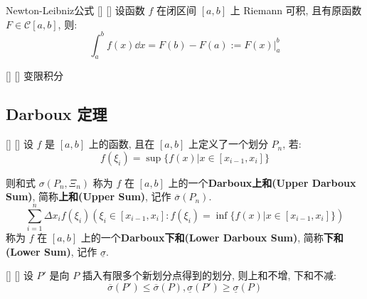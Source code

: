 \documentclass[UTF8]{ctexart}
\begin{document}
            \begin{thm}
			    []
			    {Newton-Leibniz公式}
			    []
			    []
                设函数 \(f\) 在闭区间 \([a,b]\) 上 Riemann 可积, 且有原函数 \(F\in\mathcal{C}[a,b]\), 则: 
                \[\int_a^b f(x)\dd x=F(b)-F(a):=F(x)\Big|_a^b\]
            \end{thm}

            \begin{dfn}
			    []
			    {}
			    []
			    []
                变限积分
            \end{dfn}
		
		\subsection{Darboux 定理}
			
			\begin{dfn}
			    []
			    {}
			    []
			    []
				设 \(f\) 是 \([a,b]\) 上的函数, 且在 \([a,b]\) 上定义了一个划分 \(P_n\), 若: 
				\[f(\xi_i)=\sup\{f(x)|x\in[x_{i-1},x_i]\}\]
				
				则和式 \(\sigma(P_n, \Xi_n)\) 称为 \(f\) 在 \([a,b]\) 上的一个\textbf{Darboux上和(Upper Darboux Sum)}, 简称\textbf{上和(Upper Sum)}, 记作 \(\overline{\sigma}(P_n)\). 
				\[\sum_{i=1}^{n}\Delta x_if(\xi_i)(\xi_i\in[x_{i-1},x_i]: f(\xi_i)=\inf\{f(x)|x\in[x_{i-1},x_i]\})\]
				称为 \(f\) 在 \([a,b]\) 上的一个\textbf{Darboux下和(Lower Darboux Sum)}, 简称\textbf{下和(Lower Sum)}, 记作 \(\underline{\sigma}\). 
			\end{dfn}
			
            \begin{ppt}
			    []
			    {}
			    []
			    []
                设 \(P'\) 是向 \(P\) 插入有限多个新划分点得到的划分, 则上和不增, 下和不减: \[\overline{\sigma}(P')\leq\overline{\sigma}(P), \underline{\sigma}(P')\geq\underline{\sigma}(P)\]
            \end{ppt}
\end{document}
